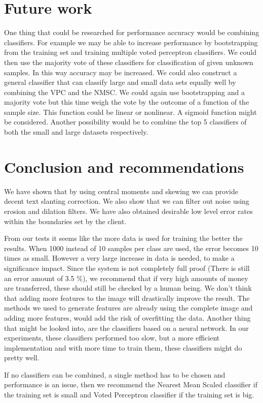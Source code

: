 \documentclass[%
        compressed,
        final,
        notitlepage,
        narroweqnarray,
        inline,
        twoside,
        ]{ieee}
\begin{document}
\section{Future work}
One thing that could be researched for performance accuracy would be combining
classifiers.  For example we may be able to increase performance by
bootstrapping from the training set and training multiple voted perceptron
classifiers. We could then use the majority vote of these classifiers for
classification of given unknown samples. In this way accuracy may be increased.
We could also construct a general classifier that can classify large and small
data sets equally well by combining the VPC and the NMSC. We could again use
bootstrapping and a majority vote but this time weigh the vote by the outcome of
a function of the sample size. This function could be linear or nonlinear. A
sigmoid function might be considered. Another possibility would be to combine
the top 5 classifiers of both the small and large datasets respectively. 

\section{Conclusion and recommendations}
We have shown that by using central moments and skewing we can provide decent
text slanting correction. We also show that we can filter out noise using
erosion and dilation filters. We have also obtained desirable low level error
rates within the boundaries set by the client.

From our tests it seems like the more data is used for training the better the
results. When 1000 instead of 10 samples per class are used, the error becomes
10 times as small. However a very large increase in data is needed, to make a
significance impact.  Since the system is not completely full proof (There is
still an error amount of 3.5 \%), we recommend that if very high amounts of
money are transferred, these should still be checked by a human being.
We don't think that adding more features to the image will drastically improve
the result. The methods we used to generate features are already using the
complete image and adding more features, would add the risk of overfitting the
data.
Another thing that might be looked into, are the classifiers based on a neural
network. In our experiments, these classifiers performed too slow, but a more
efficient implementation and with more time to train them, these classifiers
might do pretty well.

If no classifiers can be combined, a single method has to be chosen and
performance is an issue, then we recommend the Nearest Mean Scaled classifier if
the training set is small and Voted Perceptron classifier if the training set is
big.
\end{document}
